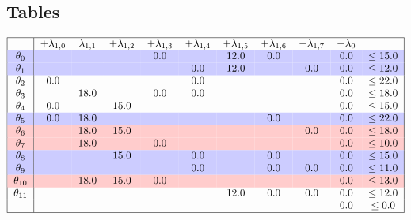 \documentclass{article}
\begin{document}
    \subsection{Tables}
    \[
        \begin{tabular}{ |c|c c c c c c c c c c| }
            \hline
            & +$\lambda_{1,0}$ & $\lambda_{1,1}$ & +$\lambda_{1,2}$ & +$\lambda_{1,3}$ & +$\lambda_{1,4}$ & +$\lambda_{1,5}$ & +$\lambda_{1,6}$ & +$\lambda_{1,7}$  & +$\lambda_{0}$ &  \\
            \rowcolor{blue!20}
            $\theta_{0}$ && & & 0.0 && 12.0 &0.0 && 0.0& $\leq 15.0$ \\
            \rowcolor{blue!20}
            $\theta_{1}$ && & & & 0.0 &12.0 && 0.0 &0.0& $\leq 12.0$ \\
            $\theta_{2}$ &0.0 && & & 0.0 && & & 0.0& $\leq 22.0$ \\
            $\theta_{3}$ && 18.0 && 0.0 &0.0 && & & 0.0& $\leq 18.0$ \\
            $\theta_{4}$ &0.0 && 15.0 && & & & & 0.0& $\leq 15.0$ \\
            \rowcolor{blue!20}
            $\theta_{5}$ &0.0 &18.0 && & & & 0.0 && 0.0& $\leq 22.0$ \\
            \rowcolor{red!20}
            $\theta_{6}$ && 18.0 &15.0 && & & & 0.0 &0.0& $\leq 18.0$ \\
            \rowcolor{red!20}
            $\theta_{7}$ && 18.0 && 0.0 && & & & 0.0& $\leq 10.0$ \\
            \rowcolor{blue!20}
            $\theta_{8}$ && & 15.0 && 0.0 && 0.0 && 0.0& $\leq 15.0$ \\
            \rowcolor{blue!20}
            $\theta_{9}$ && & & & 0.0 && 0.0 &0.0 &0.0& $\leq 11.0$ \\
            \rowcolor{red!20}
            $\theta_{10}$ && 18.0 &15.0 &0.0 && & & & 0.0& $\leq 13.0$ \\
            $\theta_{11}$ && & & & & 12.0 &0.0 &0.0 &0.0& $\leq 12.0$ \\
            && & & & &  && & 0.0 & $\leq 0.0$ \\
            \hline
        \end{tabular}
    \]
\end{document}
